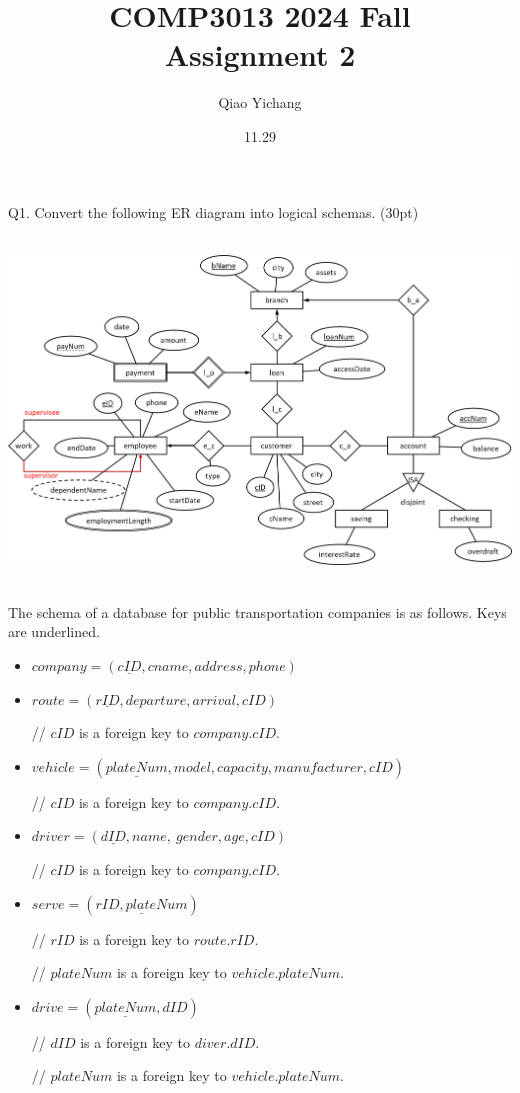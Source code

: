 \documentclass{article}
\title{COMP3013 2024 Fall\\Assignment 2}
\author{Qiao Yichang}
\date{11.29}
\begin{document}
\maketitle

Q1. Convert the following ER diagram into logical schemas. (30pt)

\includegraphics[width=5.90551in,height=3.62598in]{./image2.png}

The schema of a database for public transportation companies is as
follows. Keys are underlined.

\begin{itemize}
\item
  \(company = (\underline{cID},cname,address,phone)\)
\item
  \(route = (\underline{rID},departure,arrival,cID)\)


// \(cID\) is a foreign key to \(company.cID\).
\end{itemize}
\begin{itemize}
\item
  \(vehicle = (\underline{plateNum},model,capacity,manufacturer,cID)\)


// \(cID\) is a foreign key to \(company.cID\).
\end{itemize}
\begin{itemize}
\item
  \(driver = (\underline{dID},name,\ gender,age,cID)\)


// \(cID\) is a foreign key to \(company.cID\).
\end{itemize}
\begin{itemize}
\item
  \(serve = (\underline{rID,plateNum})\)


// \(rID\) is a foreign key to \(route.rID\).

// \(plateNum\) is a foreign key to \(vehicle.plateNum\).
\end{itemize}
\begin{itemize}
\item
  \(drive = (\underline{plateNum},dID)\)


// \(dID\) is a foreign key to \(diver.dID\).

// \(plateNum\) is a foreign key to \(vehicle.plateNum\).

\end{itemize}
\end{document}
